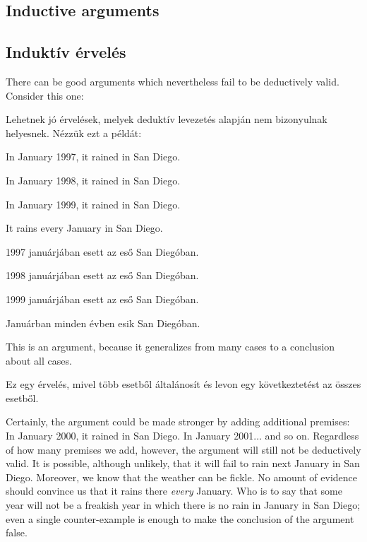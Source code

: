 \subsection*{Inductive arguments}

\subsection{Induktív érvelés}

There can be good arguments which nevertheless fail to be deductively valid. Consider this one:

Lehetnek jó érvelések, melyek deduktív levezetés alapján nem bizonyulnak helyesnek. Nézzük ezt a példát:

\begin{earg}
\item[] In January 1997, it rained in San Diego.
\item[] In January 1998, it rained in San Diego.
\item[] In January 1999, it rained in San Diego.
\item[\therefore] It rains every January in San Diego.
\end{earg}

\begin{earg}
\item[] 1997 januárjában esett az eső San Diegóban.
\item[] 1998 januárjában esett az eső San Diegóban.
\item[] 1999 januárjában esett az eső San Diegóban.
\item[\therefore] Januárban minden évben esik San Diegóban.
\end{earg}

This is an  argument, because it generalizes from many cases to a conclusion about all cases.

Ez egy  érvelés, mivel több esetből általánosít és levon egy következtetést az összes esetből.

Certainly, the argument could be made stronger by adding additional premises: In January 2000, it rained in San Diego. In January 2001$\ldots$ and so on. Regardless of how many premises we add, however, the argument will still not be deductively valid. It is possible, although unlikely, that it will fail to rain next January in San Diego. Moreover, we know that the weather can be fickle. No amount of evidence should convince us that it rains there \emph{every} January. Who is to say that some year will not be a freakish year in which there is no rain in January in San Diego; even a single counter-example is enough to make the conclusion of the argument false.

